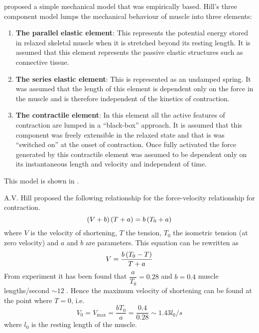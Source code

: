  proposed a simple mechanical model that was empirically
based.  Hill's three component model lumps the mechanical behaviour of muscle
into three elements:
\begin{enumerate}
\item \textbf{The parallel elastic element}: This represents the potential
  energy stored in relaxed skeletal muscle when it is stretched beyond its
  resting length. It is assumed that this element represents the passive
  elastic structures such as connective tissue.
\item \textbf{The series elastic element}: This is represented as an undamped
  spring. It was assumed that the length of this element is dependent only on
  the force in the muscle and is therefore independent of the kinetics of
  contraction.
\item \textbf{The contractile element}: In this element all the active features
  of contraction are lumped in a ``black-box'' approach. It is assumed that
  this component was freely extensible in the relaxed state and that is was
  ``switched on'' at the onset of contraction. Once fully activated the force
  generated by this contractile element was assumed to be dependent only on its
  instantaneous length and velocity and independent of time.
\end{enumerate}

This model is shown in .


A.V. Hill proposed the following relationship for the force-velocity
relationship for contraction.
\begin{equation}
  \left( V+b \right)\left( T+a \right)=b\left( T_{0}+a \right)
  \label{eqn:Hillforcevelocity}
\end{equation}
where $V$ is the velocity of shortening, $T$ the tension, $T_{0}$ the
isometric tension (at zero velocity) and $a$ and $b$ are parameters. This
equation can be rewritten as
\begin{equation}
  V=\dfrac{b\left( T_{0}-T \right)}{T+a}
  \label{eqn:Hillvelocity}
\end{equation}
From experiment it has been found that $\dfrac{a}{T_{0}}=0.28$ and $b=0.4$
muscle lengths/second $\sim 12$ \mmps. Hence the maximum velocity of
shortening can be found at the point where $T=0$, i.e.
\begin{equation}
  V_{0}=V_{\text{max}}=\dfrac{bT_{0}}{a}=\dfrac{0.4}{0.28}\sim 1.43 l_{0}/s
\end{equation}
where $l_{0}$ is the resting length of the muscle.

